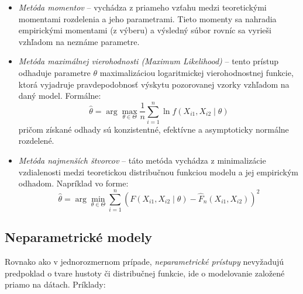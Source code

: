 \begin{itemize}
  \item \textit{Metóda momentov} – vychádza z priameho vzťahu medzi teoretickými momentami rozdelenia a jeho parametrami. Tieto momenty sa nahradia empirickými momentami (z výberu) a výsledný súbor rovníc sa vyrieši vzhľadom na neznáme parametre.

  \item \textit{Metóda maximálnej vierohodnosti (Maximum Likelihood)} – tento prístup odhaduje parametre $\theta$ maximalizáciou logaritmickej vierohodnostnej funkcie, ktorá vyjadruje pravdepodobnosť výskytu pozorovanej vzorky vzhľadom na daný model. Formálne:
  \begin{equation}
  \hat{\theta} = \arg\max_{\theta \in \Theta} \frac{1}{n} \sum_{i=1}^{n} \ln f(X_{i1}, X_{i2} \mid \theta)
  \end{equation}
  pričom získané odhady sú konzistentné, efektívne a asymptoticky normálne rozdelené.

  \item \textit{Metóda najmenších štvorcov} – táto metóda vychádza z minimalizácie vzdialenosti medzi teoretickou distribučnou funkciou modelu a jej empirickým odhadom. Napríklad vo forme:
  \begin{equation}
  \hat{\theta} = \arg\min_{\theta \in \Theta} \sum_{i=1}^{n} \left( F(X_{i1}, X_{i2} \mid \theta) - \hat{F}_n(X_{i1}, X_{i2}) \right)^2
  \end{equation}
\end{itemize}

\subsection{Neparametrické modely}\label{subsec:joint_nonparam_models}

Rovnako ako v jednorozmernom prípade, \textit{neparametrické prístupy} nevyžadujú predpoklad o tvare hustoty či distribučnej funkcie, ide o modelovanie založené priamo na dátach. Príklady:

